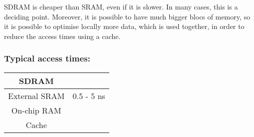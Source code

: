 \documentclass[a4paper,10pt]{article}
\begin{document}
SDRAM is cheaper than SRAM, even if it is slower. In many cases, this is a deciding point. Moreover, it is possible to have much bigger blocs of memory, so it is possible to optimise locally more data, which is used together, in order to reduce the access times using a cache. 

\subsubsection{Typical access times:}

\begin{tabular}{|c|c|}
   \hline
   SDRAM & \\
   \hline
   External SRAM & 0.5 - 5 ns\\
   \hline
   On-chip RAM & \\
   \hline
   Cache & \\
   \hline
\end{tabular}



    
\end{document}
